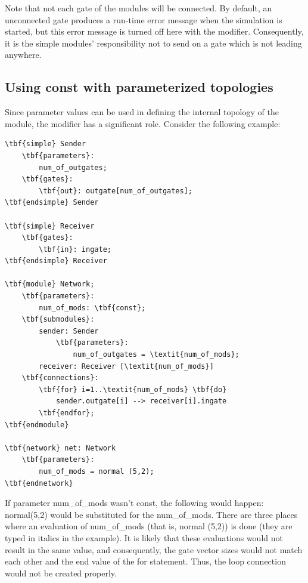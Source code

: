 Note that not each gate of the modules will be connected. By default,
an unconnected gate produces a run-time error message when the
simulation is started, but this error message is turned off here with
the  modifier.  Consequently, it
is the simple modules' responsibility not to send on a gate which is
not leading anywhere.





\subsection{Using const with parameterized topologies}


Since parameter values can be used in defining the internal topology
of the module, the  modifier has a
significant role. Consider the following example:


\begin{Verbatim}[commandchars=\\\{\}]
\tbf{simple} Sender
    \tbf{parameters}:
        num_of_outgates;
    \tbf{gates}:
        \tbf{out}: outgate[num_of_outgates];
\tbf{endsimple} Sender

\tbf{simple} Receiver
    \tbf{gates}:
        \tbf{in}: ingate;
\tbf{endsimple} Receiver

\tbf{module} Network;
    \tbf{parameters}:
        num_of_mods: \tbf{const};
    \tbf{submodules}:
        sender: Sender
            \tbf{parameters}:
                num_of_outgates = \textit{num_of_mods};
        receiver: Receiver [\textit{num_of_mods}]
    \tbf{connections}:
        \tbf{for} i=1..\textit{num_of_mods} \tbf{do}
            sender.outgate[i] --> receiver[i].ingate
        \tbf{endfor};
\tbf{endmodule}

\tbf{network} net: Network
    \tbf{parameters}:
        num_of_mods = normal (5,2);
\tbf{endnetwork}
\end{Verbatim}


If parameter num\_of\_mods wasn't const, the following would happen:\\
normal(5,2) would be substituted for the num\_of\_mods. There 
are three places where an evaluation of num\_of\_mods (that is, normal 
(5,2)) is done (they are typed in italics in the example). It 
is likely that these evaluations would not result in the same 
value, and consequently, the gate vector sizes would not match 
each other and the end value of the for statement. Thus, the 
loop connection would not be created properly.

